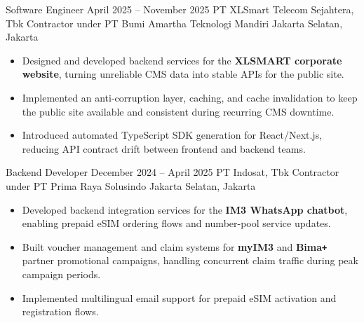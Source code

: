 \begin{jobentry}
	\role
	{Software Engineer}
	{April 2025 -- November 2025}
	{PT XLSmart Telecom Sejahtera, Tbk}
	{Contractor under PT Bumi Amartha Teknologi Mandiri}
	{Jakarta Selatan, Jakarta}
	\begin{itemize}
		\item Designed and developed backend services for the \textbf{XLSMART corporate website}, turning unreliable CMS data into stable APIs for the public site.
		\item Implemented an anti-corruption layer, caching, and cache invalidation to keep the public site available and consistent during recurring CMS downtime.
		\item Introduced automated TypeScript SDK generation for React/Next.js, reducing API contract drift between frontend and backend teams.
	\end{itemize}
\end{jobentry}

\begin{jobentry}
	\role
	{Backend Developer}
	{December 2024 -- April 2025}
	{PT Indosat, Tbk}
	{Contractor under PT Prima Raya Solusindo}
	{Jakarta Selatan, Jakarta}
	\begin{itemize}
		\item Developed backend integration services for the \textbf{IM3 WhatsApp chatbot}, enabling prepaid eSIM ordering flows and number-pool service updates.
		\item Built voucher management and claim systems for \textbf{myIM3} and \textbf{Bima\texttt{+}} partner promotional campaigns, handling concurrent claim traffic during peak campaign periods.
		\item Implemented multilingual email support for prepaid eSIM activation and registration flows.
	\end{itemize}
\end{jobentry}

